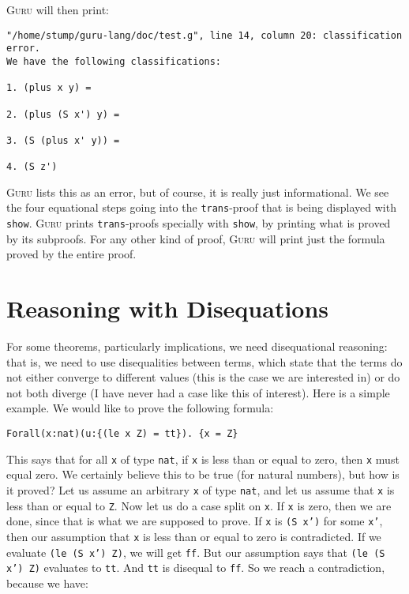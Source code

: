\documentclass{book}[12pt]
\newcommand{\guru}[0]{\textsc{Guru}\xspace}
\begin{document}
\noindent \guru will then print:

\begin{verbatim}
"/home/stump/guru-lang/doc/test.g", line 14, column 20: classification error.
We have the following classifications:

1. (plus x y) =

2. (plus (S x') y) =

3. (S (plus x' y)) =

4. (S z')
\end{verbatim}

\noindent \guru lists this as an error, but of course, it is really
just informational. We see the four equational steps going into the
\texttt{trans}-proof that is being displayed with \texttt{show}.
\guru prints \texttt{trans}-proofs specially with \texttt{show}, by
printing what is proved by its subproofs.  For any other kind of
proof, \guru will print just the formula proved by the entire proof.

\section{Reasoning with Disequations}

For some theorems, particularly implications, we need disequational
reasoning: that is, we need to use disequalities between terms, which
state that the terms do not either converge to different values (this
is the case we are interested in) or do not both diverge (I have never
had a case like this of interest).  Here is a simple example.  We would
like to prove the following formula:

\begin{verbatim}
Forall(x:nat)(u:{(le x Z) = tt}). {x = Z}
\end{verbatim}

\noindent This says that for all \texttt{x} of type \texttt{nat}, if
\texttt{x} is less than or equal to zero, then \texttt{x} must equal
zero.  We certainly believe this to be true (for natural numbers), but
how is it proved?  Let us assume an arbitrary \texttt{x} of type
\texttt{nat}, and let us assume that \texttt{x} is less than or equal
to \texttt{Z}.  Now let us do a case split on \texttt{x}.  If
\texttt{x} is zero, then we are done, since that is what we are
supposed to prove.  If \texttt{x} is \texttt{(S x')} for some
\texttt{x'}, then our assumption that \texttt{x} is less than or equal
to zero is contradicted.  If we evaluate \texttt{(le (S x') Z)}, we
will get \texttt{ff}.  But our assumption says that \texttt{(le (S x')
Z)} evaluates to \texttt{tt}.  And \texttt{tt} is disequal to
\texttt{ff}.  So we reach a contradiction, because we have:
\end{document}
